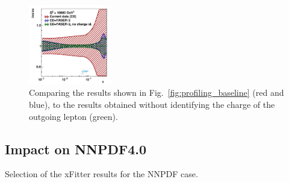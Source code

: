 \begin{figure}[t]
\includegraphics[width=0.32\textwidth]{plots/proton_fasernu2/nochargediscrimination/statOnly_FASERv2_q2_10000_pdf_s_ratio.pdf}
\caption{Comparing the results shown in Fig.~\ref{fig:profiling_baseline} (red and blue), 
to the results obtained without identifying the charge of the outgoing lepton (green).
}
\label{fig:profiling_nochargediscrimination}
\end{figure}



\subsection{Impact on NNPDF4.0}
\label{sec:nnpdf40}

Selection of the {\sc\small xFitter} results for the NNPDF case.

